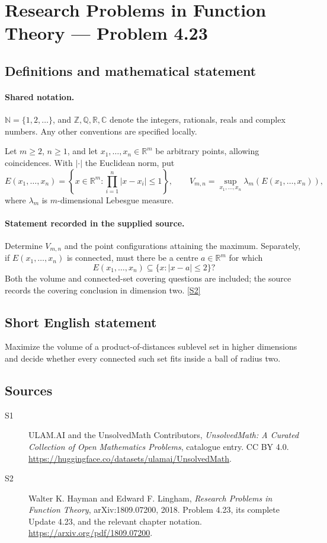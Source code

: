 \documentclass[11pt]{book}
\newcommand{\sref}[2]{\hyperlink{source:#1:#2}{[S#2]}}
\begin{document}
\section{Research Problems in Function Theory — Problem 4.23}\label{statement}

\subsection{Definitions and mathematical statement}

\paragraph{Shared notation.}$\mathbb N=\{1,2,\ldots\}$, and $\mathbb Z,\mathbb Q,\mathbb R,\mathbb C$ denote the integers, rationals, reals and complex numbers. Any other conventions are specified locally.


Let $m\ge2$, $n\ge1$, and let $x_1,\ldots,x_n\in\mathbb R^m$ be arbitrary points, allowing coincidences. With $|\cdot|$ the Euclidean norm, put
\[E(x_1,\ldots,x_n)=\left\{x\in\mathbb R^m:\prod_{i=1}^n|x-x_i|\le1\right\},\qquad
 V_{m,n}=\sup_{x_1,\ldots,x_n}\lambda_m(E(x_1,\ldots,x_n)),
\]
where $\lambda_m$ is $m$-dimensional Lebesgue measure.
\paragraph{Statement recorded in the supplied source.}
Determine $V_{m,n}$ and the point configurations attaining the maximum. Separately, if $E(x_1,\ldots,x_n)$ is connected, must there be a centre $a\in\mathbb R^m$ for which
\[E(x_1,\ldots,x_n)\subseteq\{x:|x-a|\le2\}?\]
Both the volume and connected-set covering questions are included; the source records the covering conclusion in dimension two. \sref{statement}{2}
\subsection{Short English statement}
Maximize the volume of a product-of-distances sublevel set in higher dimensions and decide whether every connected such set fits inside a ball of radius two.
\subsection{Sources}
\begin{description}
\item[\hypertarget{source:statement:1}{S1}] ULAM.AI and the UnsolvedMath Contributors, \emph{UnsolvedMath: A Curated Collection of Open Mathematics Problems}, catalogue entry. CC BY 4.0. \url{https://huggingface.co/datasets/ulamai/UnsolvedMath}.
\item[\hypertarget{source:statement:2}{S2}] Walter K. Hayman and Edward F. Lingham, \emph{Research Problems in Function Theory}, arXiv:1809.07200, 2018. Problem 4.23, its complete Update 4.23, and the relevant chapter notation. \url{https://arxiv.org/pdf/1809.07200}.
\end{description}
\label{end:statement}
\end{document}
